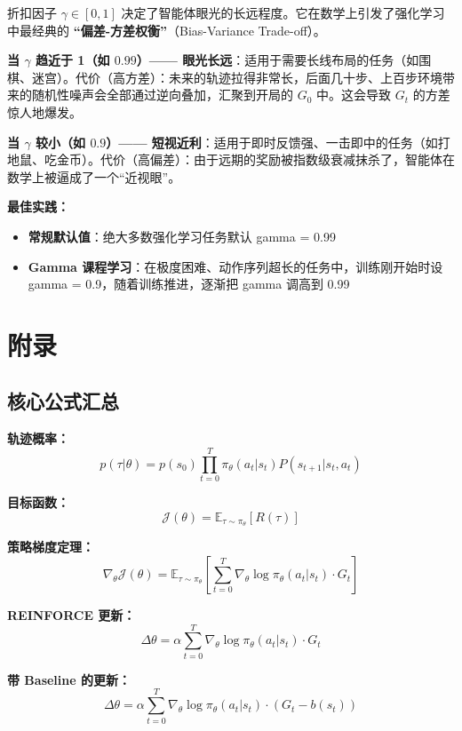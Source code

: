 \documentclass[12pt,a4paper]{article}
\newcommand{\E}{\mathbb{E}}
\newcommand{\grad}{\nabla}
\theoremstyle{noteplain}
\theoremstyle{noteexercise}
\begin{document}
折扣因子 $\gamma \in [0,1]$ 决定了智能体眼光的长远程度。它在数学上引发了强化学习中最经典的 \textbf{``偏差-方差权衡''}（Bias-Variance Trade-off）。

\textbf{当 $\gamma$ 趋近于 1（如 $0.99$）—— 眼光长远}：适用于需要长线布局的任务（如围棋、迷宫）。代价（高方差）：未来的轨迹拉得非常长，后面几十步、上百步环境带来的随机性噪声会全部通过逆向叠加，汇聚到开局的 $G_0$ 中。这会导致 $G_t$ 的方差惊人地爆发。

\textbf{当 $\gamma$ 较小（如 $0.9$）—— 短视近利}：适用于即时反馈强、一击即中的任务（如打地鼠、吃金币）。代价（高偏差）：由于远期的奖励被指数级衰减抹杀了，智能体在数学上被逼成了一个``近视眼''。

\textbf{最佳实践：}
\begin{itemize}
  \setlength{\itemsep}{0.2em}
  \item \textbf{常规默认值}：绝大多数强化学习任务默认 gamma = 0.99
  \item \textbf{Gamma 课程学习}：在极度困难、动作序列超长的任务中，训练刚开始时设 gamma = 0.9，随着训练推进，逐渐把 gamma 调高到 0.99
\end{itemize}

\appendix
\section{附录}\label{sec:appendix}

\subsection{核心公式汇总}\label{ssec:formulas}

\textbf{轨迹概率：}
\[
p(\tau|\theta) = p(s_0) \prod_{t=0}^{T} \pi_\theta(a_t|s_t) P(s_{t+1}|s_t,a_t)
\]

\textbf{目标函数：}
\[
\mathcal{J}(\theta) = \E_{\tau\sim\pi_\theta}[R(\tau)]
\]

\textbf{策略梯度定理：}
\[
\grad_\theta \mathcal{J}(\theta) = \E_{\tau\sim\pi_\theta}\left[
  \sum_{t=0}^{T} \grad_\theta \log \pi_\theta(a_t|s_t) \cdot G_t
\right]
\]

\textbf{REINFORCE 更新：}
\[
\Delta\theta = \alpha \sum_{t=0}^{T} \grad_\theta \log \pi_\theta(a_t|s_t) \cdot G_t
\]

\textbf{带 Baseline 的更新：}
\[
\Delta\theta = \alpha \sum_{t=0}^{T} \grad_\theta \log \pi_\theta(a_t|s_t) \cdot (G_t - b(s_t))
\]
\end{document}
